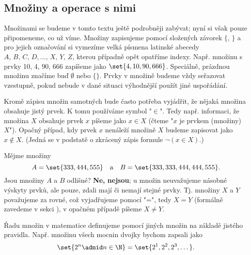 \subsection{Množiny a operace s nimi}\label{subsec:mnoziny_a_operace_s_nimi}

Množinami se budeme v tomto textu ještě podrobněji zabývat; nyní si však pouze připomeneme, co už víme. Množiny zapisujeme pomocí složených závorek $\{,\,\}$ a pro jejich označování si vymezíme velká písmena latinské abecedy\linebreak $A,\,B,\,C,\,D,\dots,\,X,\,Y,\,Z$, kterou případně opět opatříme indexy. Např. množinu s prvky 10, 4, 90, 666 zapíšeme jako $\set{4, 10, 90, 666}$. Speciálně, prázdnou množinu značíme buď $\emptyset$ nebo $\{\}$. Prvky v množině budeme vždy seřazovat vzestupně, pokud nebude v dané situaci výhodnější použít jiné uspořádání.\par
Kromě zápisu množin samotných bude často potřeba vyjádřit, že nějaká množina obsahuje jistý prvek. K tomu používáme symbol "$\in$". Tedy např. informaci, že množina $X$ obsahuje prvek $x$ píšeme jako $x\in X$ (čteme "$x$ je prvkem (množiny) $X$"). Opačný případ, kdy prvek $x$ nenáleží množině $X$ budeme zapisovat jako $x \notin X$. (Jedná se v podstatě o zkrácený zápis formule $\neg (x \in X)$.)\par
Mějme množiny
\begin{equation*}
    A=\set{333, 444, 555}\quad\text{a}\quad B=\set{333, 333, 444, 444, 555}.
\end{equation*}
Jsou množiny $A$ a $B$ odlišné? \textbf{Ne, nejsou}; u množin neuvažujeme násobné výskyty prvků, ale pouze, zdali mají či nemají stejné prvky. Tj. množiny $X$ a $Y$ považujeme za rovné, což vyjadřujeme pomocí "=", tedy $X=Y$ (formálně zavedeme v sekci ), v opačném případě píšeme $X \neq Y$.\par
Řadu množin v matematice definujeme pomocí jiných množin na základě jistého pravidla. Např. množinu všech mocnin dvojky bychom zapsali jako
\begin{equation*}
    \set{2^n \admid n \in \N}=\set{2^1, 2^2, 2^3, \dots}.
\end{equation*}

